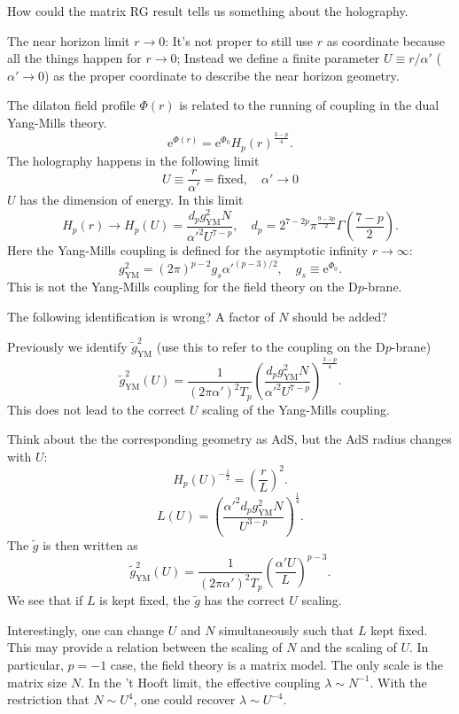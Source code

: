 \begin{problem}
	How could the matrix RG result tells us something about the holography.
\end{problem}

\newpage
The near horizon limit $r\to 0$:
It's not proper to still use $r$ as coordinate
because all the things happen for $r\to 0$; 
Instead we define a finite parameter $U\equiv r / \alpha'$
($\alpha'\to 0$)
as the proper coordinate to describe the near horizon geometry.

The dilaton field profile $\Phi(r)$ is related to the running of coupling
in the dual Yang-Mills theory.
\[
	\mathrm{e}^{\Phi(r)} = \mathrm{e}^{\Phi_0} H_p(r)^{\frac{3-p}{4}}
.\] 
The holography happens in the following limit
\begin{equation}
	U \equiv \frac{r}{\alpha'} = \text{fixed},\quad \alpha'\to 0
\end{equation}
$U$ has the dimension of energy.
In this limit
\[
H_p(r) \to H_p(U) = \frac{d_p g_{\text{YM}}^2 N}{\alpha'^2 U^{7-p}},\quad
d_p = 2^{7-2p} \pi^{\frac{9-3p}{2}} \Gamma \left(\frac{7-p}{2}\right)
.\] 
Here the Yang-Mills coupling is defined for the asymptotic infinity $r\to\infty$:
\[
	g_{\text{YM}}^2 = (2\pi)^{p-2} g_s \alpha'^{(p-3) / 2}, \quad g_s \equiv \mathrm{e}^{\Phi_0}
.\] 
This is not the Yang-Mills coupling for the field theory on the D$p$-brane.

\begin{wrong}
	The following identification is wrong?
	A factor of $N$ should be added?
\end{wrong}

Previously we identify $\tilde{g}_{\text{YM}}^2$ (use this to refer to the coupling on the D$p$-brane)
\[
	\tilde{g}_{\text{YM}}^2 (U) = \frac{1}{(2\pi\alpha')^2 T_p}
	\left( \frac{d_p g_{\text{YM}}^2 N}{\alpha'^2 U^{7-p}} \right)^{\frac{3-p}{4}} 
.\] 
This does not lead to the correct $U$ scaling of the Yang-Mills coupling.

Think about the the corresponding geometry as AdS,
but the AdS radius changes with $U$:
\[
	H_p(U)^{-\frac{1}{2}} = \left( \frac{r}{L} \right)^2 
.\] 
\[
	L(U) = \left( \frac{\alpha'^2 d_p g_{\text{YM}}^2 N}{U^{3-p}} \right) ^{\frac{1}{4}}
.\] 
The $\tilde{g}$ is then written as
\[
	\tilde{g}_{\text{YM}}^2 (U) = \frac{1}{(2\pi\alpha')^2 T_p}
	\left( \frac{\alpha' U}{L}\right)^{p-3} 
.\] 
We see that if $L$ is kept fixed, the $\tilde{g}$ has the correct $U$ scaling.

Interestingly, one can change $U$ and $N$ simultaneously such that $L$ kept fixed.
This may provide a relation between the scaling of $N$ and the scaling of $U$.
In particular, $p=-1$ case, the field theory is a matrix model.
The only scale is the matrix size $N$.
In the 't Hooft limit, the effective coupling $\lambda \sim N^{-1}$.
With the restriction that $N \sim U^4$,
one could recover $\lambda \sim U^{-4}$.
